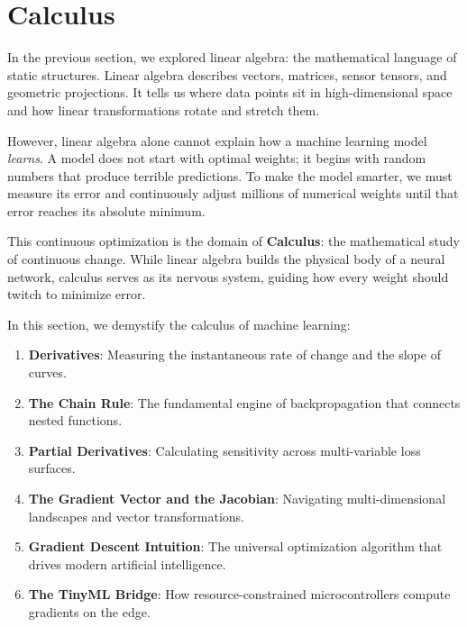 \section{Calculus}\label{sec:calculus}

In the previous section, we explored linear algebra: the mathematical language of static structures. Linear algebra describes vectors, matrices, sensor tensors, and geometric projections. It tells us where data points sit in high-dimensional space and how linear transformations rotate and stretch them.

However, linear algebra alone cannot explain how a machine learning model \textit{learns}. A model does not start with optimal weights; it begins with random numbers that produce terrible predictions. To make the model smarter, we must measure its error and continuously adjust millions of numerical weights until that error reaches its absolute minimum.

This continuous optimization is the domain of \textbf{Calculus}: the mathematical study of continuous change. While linear algebra builds the physical body of a neural network, calculus serves as its nervous system, guiding how every weight should twitch to minimize error.

In this section, we demystify the calculus of machine learning:
\begin{enumerate}
    \item \textbf{Derivatives}: Measuring the instantaneous rate of change and the slope of curves.
    \item \textbf{The Chain Rule}: The fundamental engine of backpropagation that connects nested functions.
    \item \textbf{Partial Derivatives}: Calculating sensitivity across multi-variable loss surfaces.
    \item \textbf{The Gradient Vector and the Jacobian}: Navigating multi-dimensional landscapes and vector transformations.
    \item \textbf{Gradient Descent Intuition}: The universal optimization algorithm that drives modern artificial intelligence.
    \item \textbf{The TinyML Bridge}: How resource-constrained microcontrollers compute gradients on the edge.
\end{enumerate}

